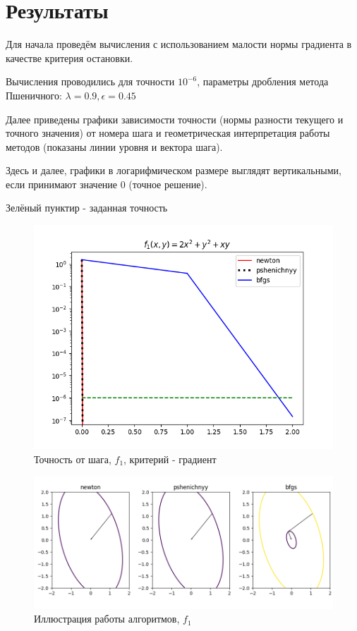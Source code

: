 \section{Результаты}
\label{sec:results}

Для начала проведём вычисления с использованием малости нормы градиента в качестве критерия остановки.

Вычисления проводились для точности $10^{-6}$, параметры дробления метода Пшеничного: $\lambda = 0.9, \epsilon = 0.45$

Далее приведены графики зависимости точности (нормы разности текущего и точного значения) от номера шага и геометрическая интерпретация работы методов (показаны линии уровня и вектора шага).

Здесь и далее, графики в логарифмическом размере выглядят вертикальными, если принимают значение 0 (точное решение).

Зелёный пунктир - заданная точность

\begin{figure}[H]
			\centering
			\includegraphics[scale=0.75]{figures/acc_from_step_func1}
			\caption{Точность от шага, $f_1$, критерий - градиент}
			\label{fig:acc_from_step_func1}
\end{figure}

\begin{figure}[H]
			\centering
			\includegraphics[scale=0.75]{figures/process_view_func1}
			\caption{Иллюстрация работы алгоритмов, $f_1$}
			\label{fig:process_view_func1}
\end{figure}

